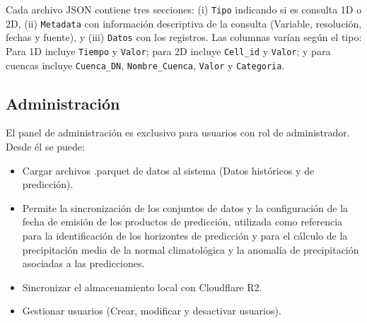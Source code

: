\begin{example}
Cada archivo JSON contiene tres secciones: (i) \texttt{Tipo} indicando si es consulta 1D o 2D, (ii) \texttt{Metadata} con información descriptiva de la consulta (Variable, resolución, fechas y fuente), y (iii) \texttt{Datos} con los registros. Las columnas varían según el tipo: Para 1D incluye \texttt{Tiempo} y \texttt{Valor}; para 2D incluye \texttt{Cell\_id} y \texttt{Valor}; y para cuencas incluye \texttt{Cuenca\_DN}, \texttt{Nombre\_Cuenca}, \texttt{Valor} y \texttt{Categoria}.
\end{example}

\subsection{Administración}
\label{subsec:administracion}

El panel de administración es exclusivo para usuarios con rol de administrador. Desde él se puede:

\begin{itemize}
    \item Cargar archivos .parquet de datos al sistema (Datos históricos y de predicción).
    \item Permite la sincronización de los conjuntos de datos y la configuración de la fecha de emisión de los productos de predicción, utilizada como referencia para la identificación de los horizontes de predicción y para el cálculo de la precipitación media de la normal climatológica y la anomalía de precipitación asociadas a las predicciones.
    \item Sincronizar el almacenamiento local con Cloudflare R2.
    \item Gestionar usuarios (Crear, modificar y desactivar usuarios).
\end{itemize}
